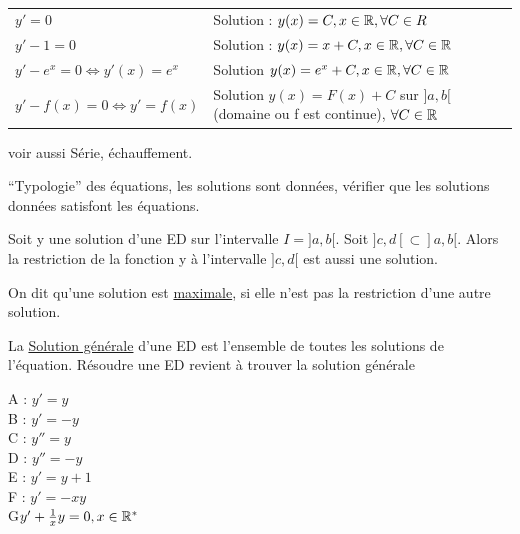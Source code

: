\documentclass[12pt,a4paper]{article}
\begin{document}
\\
\begin{tabular}{ll}
	$y' = 0$ & Solution : $y(x) = C, x\in \mathbb{R}, \forall C \in R$\\
	$y'-1 = 0$ & Solution : $y(x) = x + C, x\in \mathbb{R}, \forall C \in \mathbb{R}$\\
	$y'-e^x = 0 \iff y'(x) = e^x$ & Solution $y(x) = e^x + C, x\in \mathbb{R},\forall C \in  \mathbb{R}$\\
	$y'-f(x) = 0 \iff y' = f(x)$ & Solution $y(x) = F(x) + C$ sur $]a,b[$ (domaine ou f est continue), $\forall C \in \mathbb{R}$
\end{tabular}
voir aussi Série, échauffement.\\
\begin{boite}
	 ``Typologie'' des équations, les solutions sont données, vérifier que les solutions données satisfont les équations.
\end{boite}
\begin{boite}
	 Soit y une solution d'une ED sur l'intervalle $I = ]a,b[$. Soit $]c,d[ \subset ]a,b[$. Alors la restriction de la fonction y à l'intervalle $]c,d[$ est aussi une solution.
\end{boite}
\begin{boite}
	 On dit qu'une solution est \underline{maximale}, si elle n'est pas la restriction d'une autre solution.
\end{boite}
\begin{boite}
	 La \underline{Solution générale} d'une ED est l'ensemble de toutes les solutions de l'équation. Résoudre une ED revient à trouver la solution générale
\end{boite}
\setlength{\columnseprule}{0.05cm}
\begin{multicols}{3}
	A : $y' = y$\\
	B : $y' = -y$\\
	C : $y'' = y$\\
	D : $y'' = -y$\\
	E : $y' = y+1$\\
	F : $y' = -xy$\\ 
	G$y'+ \frac{1}{x}y = 0, x \in  \mathbb{R}^*$\\
\end{multicols}
\end{document}
